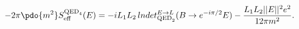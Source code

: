 \begin{equation}
\label{Eq_0608}
-2\pi \pdo{m^2} S^{\text{QED}_4}_{\text{eff}}(E)
  = - i L_1 L_2 \, lndet^{E \to L}_{\text{QED}_2} (B \to e^{-i\pi/2} E)\\
    - \frac{L_1 L_2 ||E||^2 e^2}{12 \pi m^2}.
\end{equation}

